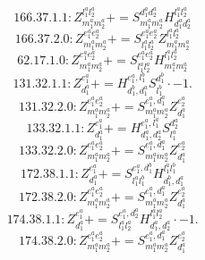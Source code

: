 \documentclass[letterpaper,10pt,fleqn,leqno,onecolumn]{article}
\begin{document}
\begin{equation} \;\;\;\;\;\;  166.37.1.1: Z^{l_{1}^{a}l_{2}^{a}}_{m_{1}^{a}m_{2}^{a}}+=S^{d_{1}^{a}d_{2}^{a}}_{m_{1}^{a}m_{2}^{a}}H^{l_{1}^{a}l_{2}^{a}}_{d_{1}^{a}d_{2}^{a}} \end{equation}
\begin{equation} \;\;\;\;\;\;  166.37.2.0: Z^{e_{1}^{a}e_{2}^{a}}_{m_{1}^{a}m_{2}^{a}}+=S^{e_{1}^{a}e_{2}^{a}}_{l_{1}^{a}l_{2}^{a}}Z^{l_{1}^{a}l_{2}^{a}}_{m_{1}^{a}m_{2}^{a}} \end{equation}
\begin{equation} \;\;\;\;\;\;  62.17.1.0: Z^{e_{1}^{a}e_{2}^{a}}_{m_{1}^{a}m_{2}^{a}}+=S^{e_{1}^{a}e_{2}^{a}}_{l_{1}^{a}l_{2}^{a}}H^{l_{1}^{a}l_{2}^{a}}_{m_{1}^{a}m_{2}^{a}} \end{equation}
\begin{equation} \;\;\;\;\;\;  131.32.1.1: Z^{e_{1}^{a}}_{d_{1}^{a}}+=H^{e_{1}^{a},l_{1}^{b}}_{d_{1}^{b},d_{1}^{a}}S^{d_{1}^{b}}_{l_{1}^{b}}\cdot -1. \end{equation}
\begin{equation} \;\;\;\;\;\;  131.32.2.0: Z^{e_{1}^{a}e_{2}^{a}}_{m_{1}^{a}m_{2}^{a}}+=S^{e_{1}^{a},d_{1}^{a}}_{m_{1}^{a}m_{2}^{a}}Z^{e_{2}^{a}}_{d_{1}^{a}} \end{equation}
\begin{equation} \;\;\;\;\;\;  133.32.1.1: Z^{e_{1}^{a}}_{d_{1}^{a}}+=H^{e_{1}^{a},l_{1}^{a}}_{d_{1}^{a},d_{2}^{a}}S^{d_{2}^{a}}_{l_{1}^{a}} \end{equation}
\begin{equation} \;\;\;\;\;\;  133.32.2.0: Z^{e_{1}^{a}e_{2}^{a}}_{m_{1}^{a}m_{2}^{a}}+=S^{e_{1}^{a},d_{1}^{a}}_{m_{1}^{a}m_{2}^{a}}Z^{e_{2}^{a}}_{d_{1}^{a}} \end{equation}
\begin{equation} \;\;\;\;\;\;  172.38.1.1: Z^{e_{1}^{a}}_{d_{1}^{a}}+=S^{e_{1}^{a},d_{1}^{b}}_{l_{1}^{a}l_{1}^{b}}H^{l_{1}^{a}l_{1}^{b}}_{d_{1}^{b},d_{1}^{a}} \end{equation}
\begin{equation} \;\;\;\;\;\;  172.38.2.0: Z^{e_{1}^{a}e_{2}^{a}}_{m_{1}^{a}m_{2}^{a}}+=S^{e_{1}^{a},d_{1}^{a}}_{m_{1}^{a}m_{2}^{a}}Z^{e_{2}^{a}}_{d_{1}^{a}} \end{equation}
\begin{equation} \;\;\;\;\;\;  174.38.1.1: Z^{e_{1}^{a}}_{d_{1}^{a}}+=S^{e_{1}^{a},d_{2}^{a}}_{l_{1}^{a}l_{2}^{a}}H^{l_{1}^{a}l_{2}^{a}}_{d_{1}^{a},d_{2}^{a}}\cdot -1. \end{equation}
\begin{equation} \;\;\;\;\;\;  174.38.2.0: Z^{e_{1}^{a}e_{2}^{a}}_{m_{1}^{a}m_{2}^{a}}+=S^{e_{1}^{a},d_{1}^{a}}_{m_{1}^{a}m_{2}^{a}}Z^{e_{2}^{a}}_{d_{1}^{a}} \end{equation}
\end{document}
